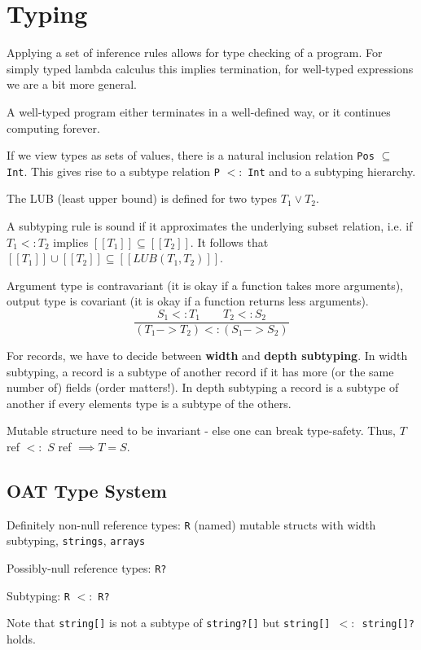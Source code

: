 \section*{Typing}

Applying a set of inference rules allows for type checking of a program. For simply typed lambda calculus this implies termination, for well-typed expressions we are a bit more general. \medskip

A well-typed program either terminates in a well-defined way, or it continues computing forever.\medskip
	
If we view types as sets of values, there is a natural inclusion relation \texttt{Pos} $ \subseteq $ \texttt{Int}. This gives rise to a subtype relation \texttt{P} $<:$ \texttt{Int} and to a subtyping hierarchy. \medskip

The LUB (least upper bound) is defined for two types $T_1 \vee T_2$.\medskip
	
A subtyping rule is sound if it approximates the underlying subset relation, i.e. if $T_1 <: T_2$ implies $[[T_1]] \subseteq [[T_2]]$. It follows that $[[T_1]] \cup [[T_2]] \subseteq [[LUB(T_1, T_2)]]$. \medskip
	
Argument type is contravariant (it is okay if a function takes more arguments), output type is covariant (it is okay if a function returns less arguments).
	$$\frac{S_1 <: T_1 \qquad T_2 <: S_2}{(T_1 -> T_2) <: (S_1 -> S_2)}$$\medskip
	
For records, we have to decide between \textbf{width} and \textbf{depth subtyping}. In width subtyping, a record is a subtype of another record if it has more (or the same number of) fields (order matters!). In depth subtyping a record is a subtype of another if every elements type is a subtype of the others.\medskip

Mutable structure need to be invariant - else one can break type-safety. Thus, $T$ ref $<:$ $S$ ref $\implies T = S$.


\subsection*{OAT Type System}
	
Definitely non-null reference types: \texttt{R} (named) mutable structs with width subtyping, \texttt{strings}, \texttt{arrays} \medskip
	
Possibly-null reference types: \texttt{R?} \medskip
	
Subtyping: \texttt{R} $<:$ \texttt{R?}\medskip

Note that \texttt{string[]} is not a subtype of \texttt{string?[]} but \texttt{string[] $<:$ string[]?} holds.
